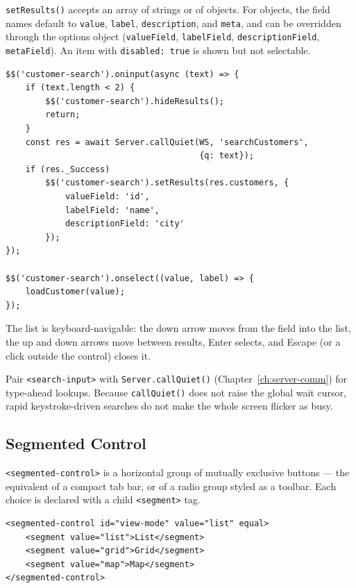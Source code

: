 \noindent
\texttt{setResults()} accepts an array of strings or of objects.  For objects, the field names default to \texttt{value}, \texttt{label}, \texttt{description}, and \texttt{meta}, and can be overridden through the options object (\texttt{valueField}, \texttt{labelField}, \texttt{descriptionField}, \texttt{metaField}).  An item with \texttt{disabled: true} is shown but not selectable.

\begin{lstlisting}[style=javascript]
$$('customer-search').oninput(async (text) => {
    if (text.length < 2) {
        $$('customer-search').hideResults();
        return;
    }
    const res = await Server.callQuiet(WS, 'searchCustomers',
                                       {q: text});
    if (res._Success)
        $$('customer-search').setResults(res.customers, {
            valueField: 'id',
            labelField: 'name',
            descriptionField: 'city'
        });
});

$$('customer-search').onselect((value, label) => {
    loadCustomer(value);
});
\end{lstlisting}

\noindent
The list is keyboard-navigable: the down arrow moves from the field into the list, the up and down arrows move between results, Enter selects, and Escape (or a click outside the control) closes it.

\begin{tipbox}
Pair \texttt{<search-input>} with \texttt{Server.callQuiet()} (Chapter~\ref{ch:server-comm}) for type-ahead lookups.  Because \texttt{callQuiet()} does not raise the global wait cursor, rapid keystroke-driven searches do not make the whole screen flicker as busy.
\end{tipbox}

\subsection{Segmented Control}
\label{sec:comp-segmented}

\texttt{<segmented-control>} is a horizontal group of mutually exclusive buttons --- the equivalent of a compact tab bar, or of a radio group styled as a toolbar.  Each choice is declared with a child \texttt{<segment>} tag.

\begin{lstlisting}[style=html]
<segmented-control id="view-mode" value="list" equal>
    <segment value="list">List</segment>
    <segment value="grid">Grid</segment>
    <segment value="map">Map</segment>
</segmented-control>
\end{lstlisting}

